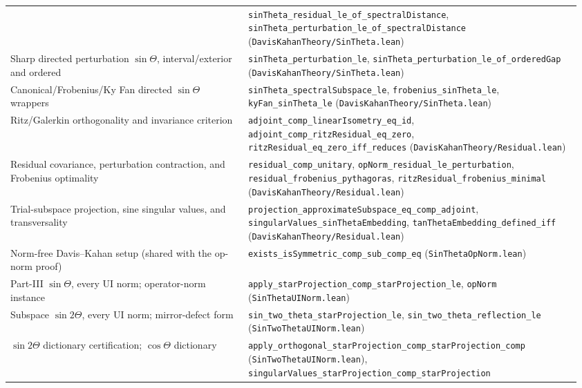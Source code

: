 \documentclass[11pt]{article}
\theoremstyle{remark}
\begin{document}
\begin{center}
\begin{tabular}{@{}p{0.40\linewidth}p{0.56\linewidth}@{}}
  & \texttt{sinTheta\_residual\_le\_of\_}\allowbreak\texttt{spectralDistance},
    \texttt{sinTheta\_perturbation\_le\_of\_}\allowbreak\texttt{spectralDistance}
    (\texttt{DavisKahanTheory/SinTheta.lean}) \\
Sharp directed perturbation $\sin\Theta$, interval/exterior and ordered
  & \texttt{sinTheta\_perturbation\_le},
    \texttt{sinTheta\_perturbation\_le\_of\_orderedGap}
    (\texttt{DavisKahanTheory/SinTheta.lean}) \\
Canonical/Frobenius/Ky Fan directed $\sin\Theta$ wrappers
  & \texttt{sinTheta\_spectralSubspace\_le},
    \texttt{frobenius\_sinTheta\_le},
    \texttt{kyFan\_sinTheta\_le}
    (\texttt{DavisKahanTheory/SinTheta.lean}) \\
Ritz/Galerkin orthogonality and invariance criterion
  & \texttt{adjoint\_comp\_linearIsometry\_eq\_id},
    \texttt{adjoint\_comp\_ritzResidual\_eq\_zero},
    \texttt{ritzResidual\_eq\_zero\_iff\_reduces}
    (\texttt{DavisKahanTheory/Residual.lean}) \\
Residual covariance, perturbation contraction, and Frobenius optimality
  & \texttt{residual\_comp\_unitary},
    \texttt{opNorm\_residual\_le\_perturbation},
    \texttt{residual\_frobenius\_pythagoras},
    \texttt{ritzResidual\_frobenius\_minimal}
    (\texttt{DavisKahanTheory/Residual.lean}) \\
Trial-subspace projection, sine singular values, and transversality
  & \texttt{projection\_approximateSubspace\_eq\_comp\_adjoint},
    \texttt{singularValues\_sinThetaEmbedding},
    \texttt{tanThetaEmbedding\_defined\_iff}
    (\texttt{DavisKahanTheory/Residual.lean}) \\
Norm-free Davis--Kahan setup (shared with the op-norm proof)
  & \texttt{exists\_isSymmetric\_comp\_sub\_comp\_eq}
    (\texttt{SinThetaOpNorm.lean}) \\
Part-III $\sin\Theta$, every UI norm; operator-norm instance
  & \texttt{apply\_starProjection\_comp\_starProjection\_le},
    \texttt{opNorm} (\texttt{SinThetaUINorm.lean}) \\
Subspace $\sin2\Theta$, every UI norm; mirror-defect form
  & \texttt{sin\_two\_theta\_starProjection\_le},
    \texttt{sin\_two\_theta\_reflection\_le}
    (\texttt{SinTwoThetaUINorm.lean}) \\
$\sin2\Theta$ dictionary certification; $\cos\Theta$ dictionary
  & \texttt{apply\_orthogonal\_starProjection\_comp\_starProjection\_comp}
    (\texttt{SinTwoThetaUINorm.lean}),
    \texttt{singularValues\_starProjection\_comp\_starProjection}

\end{tabular}
\end{center}
\end{document}

